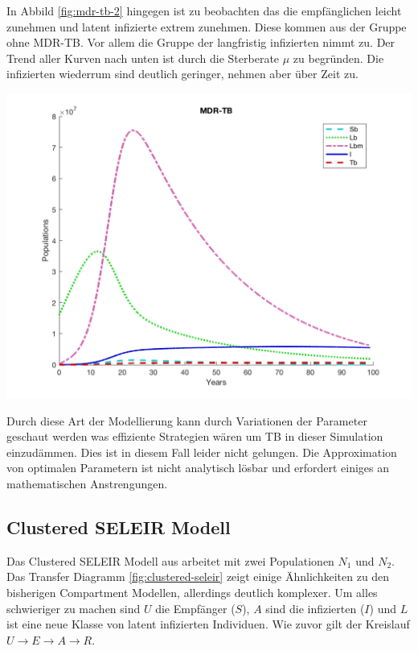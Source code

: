 \documentclass[paper=a4, fontsize=11pt, ngerman, abstract=on]{scrartcl}
\numberwithin{equation}{section} %
\numberwithin{figure}{section} %
\numberwithin{table}{section} %
\begin{document}
\begin{minipage}{0.4\linewidth}
  In Abbild \ref{fig:mdr-tb-2} hingegen ist zu beobachten das die empfänglichen leicht zunehmen und latent infizierte extrem zunehmen. Diese kommen aus der Gruppe ohne MDR-TB. Vor allem die Gruppe der langfristig infizierten nimmt zu. Der Trend aller Kurven nach unten ist durch die Sterberate $\mu$ zu begründen. Die infizierten wiederrum sind deutlich geringer, nehmen aber über Zeit zu.
\end{minipage}\hfill
\begin{minipage}{0.6\linewidth}
  \includegraphics[width=\linewidth]{images/mdr_tb_2}
  \label{fig:mdr-tb-2}
\end{minipage}

Durch diese Art der Modellierung kann durch Variationen der Parameter geschaut werden was effiziente Strategien wären um TB in dieser Simulation einzudämmen. Dies ist in diesem Fall leider nicht gelungen. Die Approximation von optimalen Parametern ist nicht analytisch lösbar und erfordert einiges an mathematischen Anstrengungen.

\subsection{Clustered SELEIR Modell}

Das Clustered SELEIR Modell aus \cite{ModellingTBEpidemics2009} arbeitet mit zwei Populationen $N_{1}$ und $N_{2}$. Das Transfer Diagramm \ref{fig:clustered-seleir} zeigt einige Ähnlichkeiten zu den bisherigen Compartment Modellen, allerdings deutlich komplexer. Um alles schwieriger zu machen sind $U$ die Empfänger ($S$), $A$ sind die infizierten ($I$) und $L$ ist eine neue Klasse von latent infizierten Individuen. Wie zuvor gilt der Kreislauf $U \rightarrow E \rightarrow A \rightarrow R$.
\end{document}
